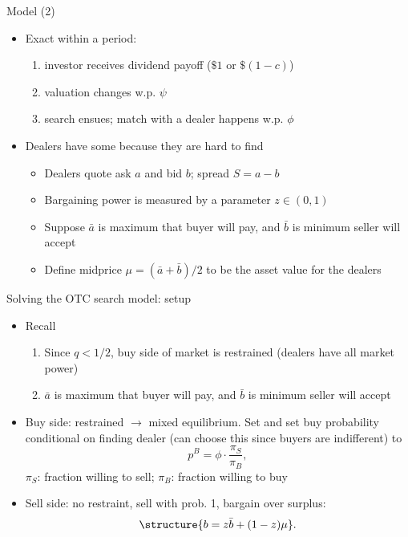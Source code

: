 \documentclass[english,10pt
,aspectratio=169
]{beamer}
\begin{document}
\begin{frame}{Model (2)}
	\begin{itemize}
		\item Exact  within a period:
		\begin{enumerate}
			\item investor receives dividend payoff ($\$1$ or $\$(1-c)$)
			\item valuation changes w.p. $\psi$
			\item search ensues; match with a dealer happens w.p. $\phi$
		\end{enumerate}
		\item Dealers have some  because they are hard to find
		\begin{itemize}
			\item Dealers quote ask $a$ and bid $b$; spread $S=a-b$
			\item Bargaining power is measured by a parameter $z \in (0,1)$
			\item Suppose $\bar{a}$ is maximum that buyer will pay,  and $\bar{b}$ is minimum seller will accept
			\item Define midprice $\mu=(\bar{a}+\bar{b})/2$ to be the asset value for the dealers
		\end{itemize}
	\end{itemize}
\end{frame}


\begin{frame}[label=solve]{Solving the OTC search model: setup}
	\begin{itemize}
		\item Recall
		\begin{enumerate}
			\item Since $q<1/2$, buy side of market is restrained (dealers have all market power)
			\item $\bar{a}$ is maximum that buyer will pay,  and $\bar{b}$ is minimum seller will accept
		\end{enumerate}
		\item \alert{Buy side:} restrained $\rightarrow$ mixed equilibrium. Set  and set buy probability conditional on finding dealer (can choose this since buyers are indifferent) to
		\[
		p^B = \phi \cdot \frac{\pi_S}{\pi_B},
		\]
		\alert{$\pi_S$}: fraction willing to sell; \alert{$\pi_B$}: fraction willing to buy
		\item \alert{Sell side:} no restraint, sell with prob. 1, bargain over surplus: 
		\[
		\structure{b=z\bar{b}+(1-z)\mu}.
		\]
	\end{itemize}
\end{frame}
\end{document}
